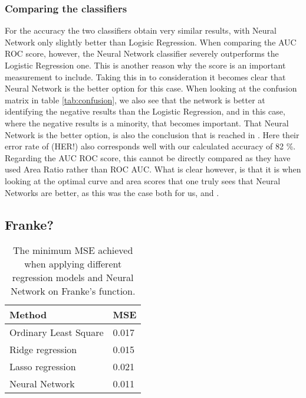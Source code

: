 \subsubsection{Comparing the classifiers}
For the accuracy the two classifiers obtain very similar results, with Neural Network only slightly better than Logisic Regression. When comparing the AUC ROC score, however, the Neural Network classifier severely outperforms the Logistic Regression one. This is another reason why the score is an important measurement to include. Taking this in to consideration it becomes clear that Neural Network is the better option for this case. When looking at the confusion matrix in table \ref{tab:confusion}, we also see that the network is better at identifying the negative results than the Logistic Regression, and in this case, where the negative results is a minority, that becomes important. That Neural Network is the better option, is also the conclusion that is reached in \cite{yeh2009UCI}. Here their error rate of (HER!) also corresponds well with our calculated accuracy of 82 \%. Regarding the AUC ROC score, this cannot be directly compared as they have used Area Ratio rather than ROC AUC. What is clear however, is that it is when looking at the optimal curve and area scores that one truly sees that Neural Networks are better, as this was the case both for us, and \cite{yeh2009UCI}.

\subsection{Franke?}
\begin{table}[htbp]
	\renewcommand{\arraystretch}{1.2}
	\centering
	\caption{The minimum MSE achieved when applying different regression models and Neural Network on Franke's function.}
	\begin{tabular}{l l}
		\toprule
		Method & MSE \\
		\midrule
		Ordinary Least Square & 0.017 \\
		Ridge regression & 0.015\\
		Lasso regression & 0.021\\
		Neural Network & 0.011\\
		\bottomrule
	\end{tabular}
	\label{tab:mse}
\end{table}
